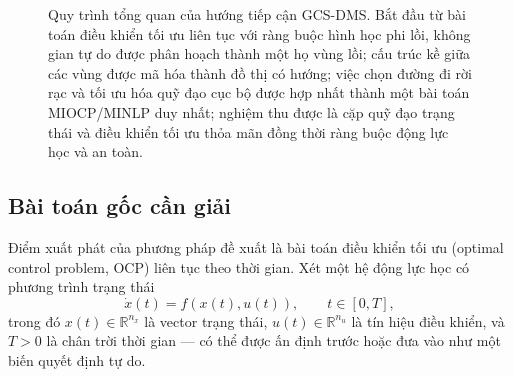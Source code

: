 \begin{figure}[!htp]
\centering
{}
\caption[Quy trình tổng quan GCS-DMS]{Quy trình tổng quan của hướng tiếp cận GCS-DMS. Bắt đầu từ bài toán điều khiển tối ưu liên tục với ràng buộc hình học phi lồi, không gian tự do được phân hoạch thành một họ vùng lồi; cấu trúc kề giữa các vùng được mã hóa thành đồ thị có hướng; việc chọn đường đi rời rạc và tối ưu hóa quỹ đạo cục bộ được hợp nhất thành một bài toán MIOCP/MINLP duy nhất; nghiệm thu được là cặp quỹ đạo trạng thái và điều khiển tối ưu thỏa mãn đồng thời ràng buộc động lực học và an toàn.}
\label{fig:ocp_DMS_pipeline}
\end{figure}

\subsection{Bài toán gốc cần giải}
\label{subsec:ocp_original}

Điểm xuất phát của phương pháp đề xuất là bài toán điều khiển tối ưu (optimal control problem, OCP) liên tục theo thời gian. Xét một hệ động lực học có phương trình trạng thái
\begin{equation}
\dot x(t)=f(x(t),u(t)),
\qquad t\in[0,T],
\label{eq:ct_dyn}
\end{equation}
trong đó $x(t)\in\mathbb{R}^{n_x}$ là vector trạng thái, $u(t)\in\mathbb{R}^{n_u}$ là tín hiệu điều khiển, và $T>0$ là chân trời thời gian — có thể được ấn định trước hoặc đưa vào như một biến quyết định tự do.

